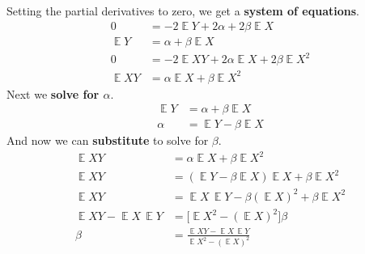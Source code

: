 \documentclass[11pt]{article}
\DeclareMathOperator\E{\mathbb{E}}
\begin{document}
Setting the partial derivatives to zero, we get a \textbf{system of equations}.
\begin{align*}
0 &= -2 \E Y + 2 \alpha + 2 \beta \E X\\
\E Y &= \alpha + \beta \E X\\
0 &= -2 \E X Y + 2 \alpha \E X + 2 \beta \E X ^{2}\\
\E X Y &= \alpha \E X + \beta \E X ^{2}
\end{align*}
Next we \textbf{solve for \(\alpha\)}.
\begin{align*}
\E Y &= \alpha + \beta \E X\\
\alpha &= \E Y - \beta \E X
\end{align*}
And now we can \textbf{substitute} to solve for \(\beta\).
\begin{align*}
\E X Y &= \alpha \E X + \beta \E X ^{2}\\
\E X Y &= (\E Y - \beta \E X) \E X + \beta \E X ^{2}\\
\E X Y &= \E X \, \E Y - \beta (\E X)^{2} + \beta \E X ^{2}\\
\E X Y - \E X \, \E Y &= \big[\E X^{2} - (\E X)^{2}\big] \beta\\
\beta &= \frac{\E X Y - \E X \, \E Y}{\E X^{2} - (\E X)^{2}}
\end{align*}
\end{document}
